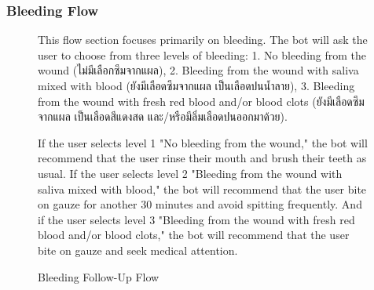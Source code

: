 \documentclass[12pt,oneside,openright,a4paper]{cpe-english-project}
\begin{document}
        \subsubsection{Bleeding Flow}
          \begin{figure}[!h]
            \centering
            \caption{Bleeding Follow-Up Flow}\label{fig:FollowUpFlow2}
            \begin{flushleft}
              \qquad This flow section focuses primarily on bleeding. The bot will ask the user to choose from three levels of bleeding: 1. No bleeding from the wound \textthai{(ไม่มีเลือกซึมจากแผล)}, 2. Bleeding from the wound with saliva mixed with blood \textthai{(ยังมีเลือดซึมจากแผล เป็นเลือดปนน้ำลาย)}, 3. Bleeding from the wound with fresh red blood and/or blood clots \textthai{(ยังมีเลือดซึมจากแผล เป็นเลือดสีแดงสด และ/หรือมีลิ่มเลือดปนออกมาด้วย)}.\par
              \qquad If the user selects level 1 "No bleeding from the wound," the bot will recommend that the user rinse their mouth and brush their teeth as usual. If the user selects level 2 "Bleeding from the wound with saliva mixed with blood," the bot will recommend that the user bite on gauze for another 30 minutes and avoid spitting frequently. And if the user selects level 3 "Bleeding from the wound with fresh red blood and/or blood clots," the bot will recommend that the user bite on gauze and seek medical attention.\par
            \end{flushleft}        
          \end{figure}
\end{document}
